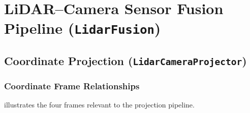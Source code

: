\documentclass[12pt,a4paper]{article}
\begin{document}
\section{LiDAR--Camera Sensor Fusion Pipeline (\texttt{LidarFusion})}
\label{sec:fusion}

\subsection{Coordinate Projection (\texttt{LidarCameraProjector})}
\label{subsec:projection}

\subsubsection{Coordinate Frame Relationships}

 illustrates the four frames relevant to the
projection pipeline.
\end{document}
